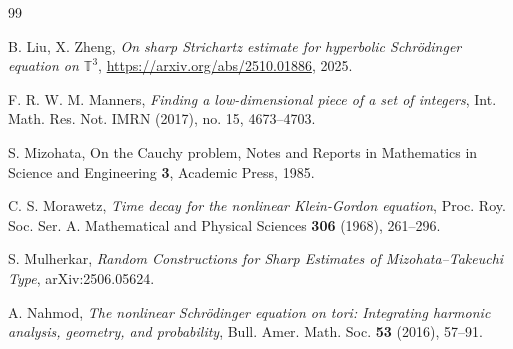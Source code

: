 \documentclass[11pt,reqno]{amsart}
\numberwithin{equation}{section}
\begin{document}
\begin{thebibliography}{99}

 B. Liu, X. Zheng, \textit{On sharp Strichartz estimate for hyperbolic Schr\"{o}dinger equation on $\mathbb{T}^3$}, \url{https://arxiv.org/abs/2510.01886}, 2025.





 F. R. W. M. Manners, \textit{Finding a low-dimensional piece of a set of integers}, Int. Math. Res. Not. IMRN (2017), no. 15, 4673--4703.



 S. Mizohata, On the Cauchy problem, Notes and Reports in Mathematics in Science and Engineering \textbf{3}, Academic Press, 1985.

 C. S. Morawetz, \textit{Time decay for the nonlinear Klein-Gordon equation}, Proc. Roy. Soc. Ser. A. Mathematical and Physical Sciences \textbf{306} (1968), 261--296.

 S. Mulherkar, \textit{Random Constructions for Sharp Estimates of Mizohata--Takeuchi Type}, arXiv:2506.05624.

 A. Nahmod, \textit{The nonlinear Schr\"{o}dinger equation on tori: Integrating harmonic analysis, geometry, and probability}, Bull. Amer. Math. Soc. \textbf{53} (2016), 57--91.



\end{thebibliography}
\end{document}
